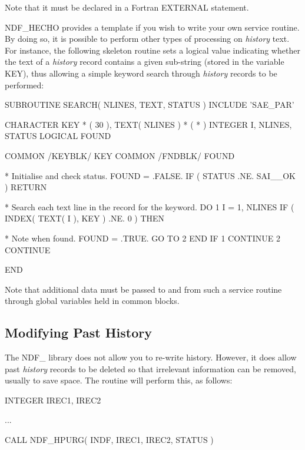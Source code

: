 \documentclass[twoside,11pt,nolof]{starlink}
\providecommand{\st}[1]{{\emph{#1}}}
\begin{document}
Note that it must be declared in a Fortran EXTERNAL statement.

NDF\_HECHO provides a template if you wish to write your own service
routine. By doing so, it is possible to perform other types of
processing on \st{history\/} text. For instance, the following skeleton
routine sets a logical value indicating whether the text of a
\st{history\/} record contains a given sub-string (stored in the
variable
KEY), thus allowing a simple keyword search through \st{history\/}
records to be performed:

\small
\begin{terminalv}
      SUBROUTINE SEARCH( NLINES, TEXT, STATUS )
      INCLUDE 'SAE_PAR'

      CHARACTER KEY * ( 30 ), TEXT( NLINES ) * ( * )
      INTEGER I, NLINES, STATUS
      LOGICAL FOUND

      COMMON /KEYBLK/ KEY
      COMMON /FNDBLK/ FOUND

*  Initialise and check status.
      FOUND = .FALSE.
      IF ( STATUS .NE. SAI__OK ) RETURN

*  Search each text line in the record for the keyword.
      DO 1 I = 1, NLINES
        IF ( INDEX( TEXT( I ), KEY ) .NE. 0 ) THEN

*  Note when found.
           FOUND = .TRUE.
           GO TO 2
        END IF
 1    CONTINUE
 2    CONTINUE

      END
\end{terminalv}
\normalsize

Note that additional data must be passed to and from such a service
routine through global variables held in common blocks.

\subsection{Modifying Past History}

The NDF\_ library does not allow you to re-write history. However, it
does allow past \st{history\/} records to be deleted so that irrelevant
information can be removed, usually to save space. The routine
 will perform this, as follows:

\small
\begin{terminalv}
      INTEGER IREC1, IREC2

      ...

      CALL NDF_HPURG( INDF, IREC1, IREC2, STATUS )
\end{terminalv}
\normalsize
\end{document}
